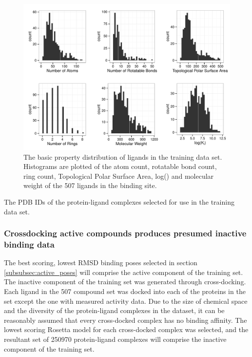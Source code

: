 \begin{figure}
\centering
\includegraphics[width=6in]{figures/hts/basic_ligand_properties.pdf}
\caption{
The basic property distribution of ligands in the training data set.  Histograms are plotted of the atom count, rotatable bond count, ring count, Topological Polar Surface Area, log(\ki) and molecular weight of the 507 ligands in the binding site. 
}
\label{fig:training_ligands}
\end{figure}
\begin{table}
\scriptsize
\renewcommand{\tabcolsep}{0.09cm}
\centering

\caption{The \acs{PDB} IDs of the protein-ligand complexes selected for use in the training data set.}
\label{table:training_pdbs}
\end{table}

\subsubsection{Crossdocking active compounds produces presumed inactive binding data}
The best scoring, lowest \ac{RMSD} binding poses selected in section \ref{subsubsec:active_poses} will comprise the active component of the training set.
The inactive component of the training set was generated through cross-docking.
Each ligand in the 507 compound set was docked into each of the proteins in the set except the one with measured activity data.
Due to the size of chemical space \citep{Reymond:2012un} and the diversity of the protein-ligand complexes in the dataset, it can be reasonably assumed that every cross-docked complex has no binding affinity.
The lowest scoring Rosetta model for each cross-docked complex was selected, and the resultant set of 250970 protein-ligand complexes will comprise the inactive component of the training set.

